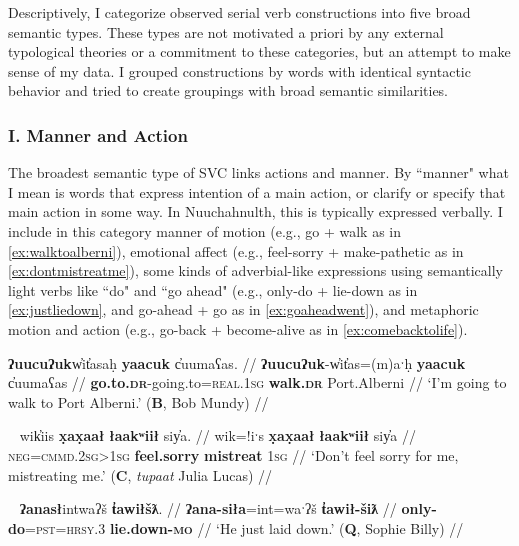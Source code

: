 Descriptively, I categorize observed serial verb constructions into five broad semantic types. These types are not motivated a priori by any external typological theories or a commitment to these categories, but an attempt to make sense of my data. I grouped constructions by words with identical syntactic behavior and tried to create groupings with broad semantic similarities.

\vspace{10pt}

\subsubsection{I. Manner and Action} \label{ch:sv:mannerandaction}

\vspace{10pt}

The broadest semantic type of SVC links actions and manner. By ``manner" what I mean is words that express intention of a main action, or clarify or specify that main action in some way. In Nuuchahnulth, this is typically expressed verbally. I include in this category manner of motion (e.g., go + walk as in \ref{ex:walktoalberni}), emotional affect (e.g., feel-sorry + make-pathetic as in \ref{ex:dontmistreatme}), some kinds of adverbial-like expressions using semantically light verbs like ``do" and ``go ahead" (e.g., only-do + lie-down as in \ref{ex:justliedown}, and go-ahead + go as in \ref{ex:goaheadwent}), and metaphoric motion and action (e.g., go-back + become-alive as in \ref{ex:comebacktolife}).

\ex \label{ex:walktoalberni}
\begingl
\glpreamble \textbf{ʔuucuʔuk}w̓it̓asaḥ \textbf{yaacuk} c̓uumaʕas. //
\gla \textbf{ʔuucuʔuk}-w̓it̓as=(m)aˑḥ \textbf{yaacuk} c̓uumaʕas //
\glb \textbf{go.to.\textsc{dr}}-going.to=\textsc{real.1sg} \textbf{walk.\textsc{dr}} Port.Alberni //
\glft `I'm going to walk to Port Alberni.' (\textbf{B}, Bob Mundy) //
\endgl
\xe

\ex~ \label{ex:dontmistreatme}
\begingl
\glpreamble wik̓iis \textbf{x̣ax̣aał} \textbf{łaakʷiił} siy̓a. //
\gla wik=!iˑs \textbf{x̣ax̣aał} \textbf{łaakʷiił} siy̓a //
\glb \textsc{neg}=\textsc{cmmd.2sg>1sg} \textbf{feel.sorry} \textbf{mistreat} \textsc{1sg} //
\glft `Don't feel sorry for me, mistreating me.' (\textbf{C}, \textit{tupaat} Julia Lucas) //
\endgl
\xe

\ex~ \label{ex:justliedown}
\begingl
\glpreamble \textbf{ʔanasł}intwaʔš \textbf{t̓awiłšƛ}. //
\gla \textbf{ʔana-siła}=int=waˑʔš \textbf{t̓awił-šiƛ} //
\glb \textbf{only-do}=\textsc{pst}=\textsc{hrsy.3} \textbf{lie.down-\textsc{mo}} //
\glft `He just laid down.' (\textbf{Q}, Sophie Billy) //
\endgl
\xe

